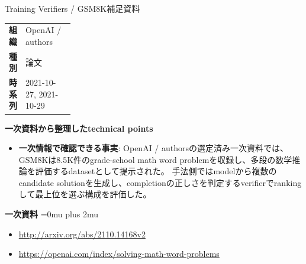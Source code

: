 \begin{technicalnote}{Training Verifiers / GSM8K}{補足資料}
\begingroup
\begin{tabularx}{\linewidth}{@{}>{\bfseries}p{0.22\linewidth}X@{}}
組織 & OpenAI / authors \\
種別 & 論文 \\
時系列 & 2021-10-27, 2021-10-29 \\
\end{tabularx}
\smallskip
{\bfseries 一次資料から整理したtechnical points}
\begin{itemize}[leftmargin=1.5em,itemsep=0.35em]
\item \textbf{一次情報で確認できる事実}: OpenAI / authorsの選定済み一次資料では、GSM8Kは8.5K件のgrade-school math word problemを収録し、多段の数学推論を評価するdatasetとして提示された。 手法側ではmodelから複数のcandidate solutionを生成し、completionの正しさを判定するverifierでrankingして最上位を選ぶ構成を評価した。
\end{itemize}
\begin{minipage}{\linewidth}
\begin{samepage}
{\bfseries 一次資料}
\begingroup\sloppy
\Urlmuskip=0mu plus 2mu\relax
\begin{itemize}[leftmargin=1.5em,itemsep=0.25em]
\item {\scriptsize\url{http://arxiv.org/abs/2110.14168v2}}
\item {\scriptsize\url{https://openai.com/index/solving-math-word-problems}}
\end{itemize}
\endgroup
\end{samepage}
\end{minipage}
\endgroup
\end{technicalnote}
\medskip
